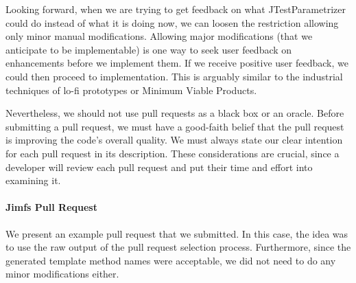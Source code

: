 Looking forward, when we are trying to get feedback on what JTestParametrizer could do instead of what it is doing now, we can loosen the restriction allowing only minor manual modifications. Allowing major modifications (that we anticipate to be implementable) is one way to seek user feedback on enhancements before we implement them. If we receive positive user feedback, we could then proceed to implementation. This is arguably similar to the industrial techniques of lo-fi prototypes or Minimum Viable Products.





Nevertheless, we should not use pull requests as a black box or an oracle. Before submitting a pull request, we must have a good-faith belief that the pull request is improving the code's overall quality. We must always state our clear intention for each pull request in its description. These considerations are crucial, since a developer will review each pull request and put their time and effort into examining it. 

\paragraph{Jimfs Pull Request}
We present an example pull request that we submitted. In this case, the idea was to use the raw output of the pull request selection process. Furthermore, since the generated template method names were acceptable, we did not need to do any minor modifications either.

